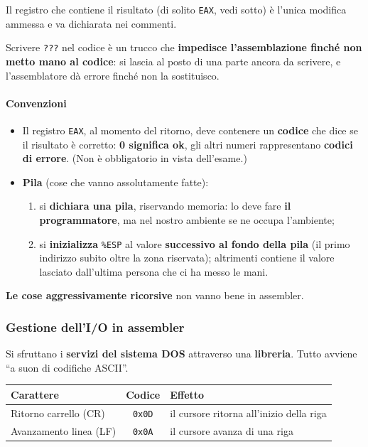 \documentclass[11pt,a4paper]{article}
\begin{document}
\begin{integrazione}
Il registro che contiene il risultato (di solito \texttt{EAX}, vedi sotto) è l'unica modifica ammessa e va dichiarata nei commenti.
\end{integrazione}

\begin{nota}[Il simbolo ???]
Scrivere \texttt{???} nel codice è un trucco che \textbf{impedisce l'assemblazione finché non metto mano al codice}: si lascia al posto di una parte ancora da scrivere, e l'assemblatore dà errore finché non la sostituisco.
\end{nota}

\paragraph*{Convenzioni}

\begin{itemize}[leftmargin=*]
  \item Il registro \texttt{EAX}, al momento del ritorno, deve contenere un \textbf{codice} che dice se il risultato è corretto: \textbf{0 significa ok}, gli altri numeri rappresentano \textbf{codici di errore}. (Non è obbligatorio in vista dell'esame.)
  \item \textbf{Pila} (cose che vanno assolutamente fatte):
  \begin{enumerate}
    \item si \textbf{dichiara una pila}, riservando memoria: lo deve fare \textbf{il programmatore}, ma nel nostro ambiente se ne occupa l'ambiente;
    \item si \textbf{inizializza} \texttt{\%ESP} al valore \textbf{successivo al fondo della pila} (il primo indirizzo subito oltre la zona riservata); altrimenti contiene il valore lasciato dall'ultima persona che ci ha messo le mani.
  \end{enumerate}
\end{itemize}

\textbf{Le cose aggressivamente ricorsive} non vanno bene in assembler.

\subsubsection*{Gestione dell'I/O in assembler}

Si sfruttano i \textbf{servizi del sistema DOS} attraverso una \textbf{libreria}. Tutto avviene ``a suon di codifiche ASCII''.

\begin{center}
\begin{tabular}{l c l}
\textbf{Carattere} & \textbf{Codice} & \textbf{Effetto} \\ \hline
Ritorno carrello (CR) & \texttt{0x0D} & il cursore ritorna all'inizio della riga \\
Avanzamento linea (LF) & \texttt{0x0A} & il cursore avanza di una riga \\
\end{tabular}
\end{center}
\end{document}
